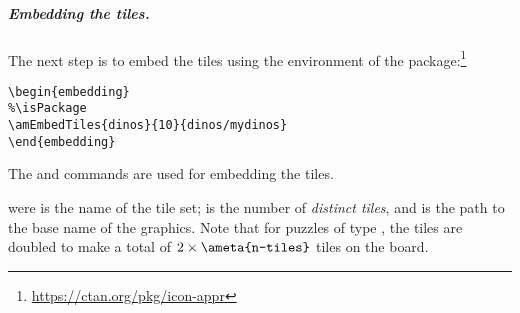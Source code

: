 \documentclass{article}
\edef\amtIndent{\the\parindent}
\begin{document}
\subparagraph*{Embedding the tiles.} The next step is to embed the tiles
using the  environment of the 
package:\footnote{\url{https://ctan.org/pkg/icon-appr}}
\begin{Verbatim}[fontsize=\small,xleftmargin=\amtIndent]
\begin{embedding}
%\isPackage
\amEmbedTiles{dinos}{10}{dinos/mydinos}
\end{embedding}
\end{Verbatim}
The  and  commands are used for embedding the
tiles.
\bVerb{}%
\begin{dCmd}[commandchars=!()]{\bxSize}
\isPackage
{}
\end{dCmd}
\eVerb were  is the name of the tile set;  is the
number of \emph{distinct tiles}, and  is the path to the base name of
the graphics. Note that for puzzles of type , the tiles are
doubled to make a total of $2\times \texttt{\ameta{n-tiles}}$ tiles on the board.
\end{document}
